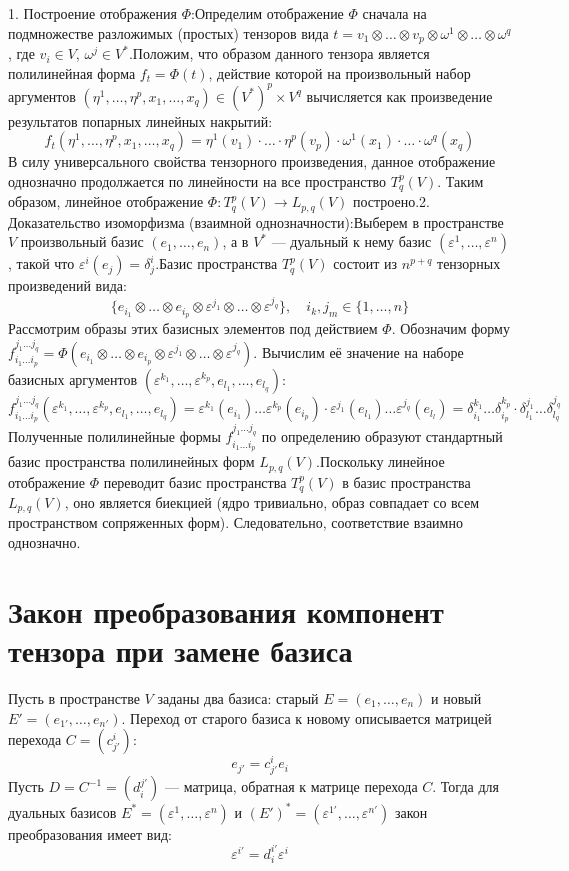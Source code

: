 \documentclass[14pt]{extreport}
\begin{document}
    \begin{prbox}
        1. Построение отображения $\Phi$:Определим отображение $\Phi$ сначала на подмножестве разложимых (простых) тензоров вида $t = v_1 \otimes \dots \otimes v_p \otimes \omega^1 \otimes \dots \otimes \omega^q$, где $v_i \in V$, $\omega^j \in V^*$.Положим, что образом данного тензора является полилинейная форма $f_t = \Phi(t)$, действие которой на произвольный набор аргументов $(\eta^1, \dots, \eta^p, x_1, \dots, x_q) \in (V^*)^p \times V^q$ вычисляется как произведение результатов попарных линейных накрытий:$$f_t(\eta^1, \dots, \eta^p, x_1, \dots, x_q) = \eta^1(v_1) \cdot \dots \cdot \eta^p(v_p) \cdot \omega^1(x_1) \cdot \dots \cdot \omega^q(x_q)$$В силу универсального свойства тензорного произведения, данное отображение однозначно продолжается по линейности на все пространство $T_q^p(V)$. Таким образом, линейное отображение $\Phi: T_q^p(V) \to L_{p,q}(V)$ построено.2. Доказательство изоморфизма (взаимной однозначности):Выберем в пространстве $V$ произвольный базис $(e_1, \dots, e_n)$, а в $V^*$ — дуальный к нему базис $(\varepsilon^1, \dots, \varepsilon^n)$, такой что $\varepsilon^i(e_j) = \delta_j^i$.Базис пространства $T_q^p(V)$ состоит из $n^{p+q}$ тензорных произведений вида:$$\{e_{i_1} \otimes \dots \otimes e_{i_p} \otimes \varepsilon^{j_1} \otimes \dots \otimes \varepsilon^{j_q}\}, \quad i_k, j_m \in \{1, \dots, n\}$$Рассмотрим образы этих базисных элементов под действием $\Phi$. Обозначим форму $f_{i_1 \dots i_p}^{j_1 \dots j_q} = \Phi(e_{i_1} \otimes \dots \otimes e_{i_p} \otimes \varepsilon^{j_1} \otimes \dots \otimes \varepsilon^{j_q})$. Вычислим её значение на наборе базисных аргументов $(\varepsilon^{k_1}, \dots, \varepsilon^{k_p}, e_{l_1}, \dots, e_{l_q})$:$$f_{i_1 \dots i_p}^{j_1 \dots j_q}(\varepsilon^{k_1}, \dots, \varepsilon^{k_p}, e_{l_1}, \dots, e_{l_q}) = \varepsilon^{k_1}(e_{i_1}) \dots \varepsilon^{k_p}(e_{i_p}) \cdot \varepsilon^{j_1}(e_{l_1}) \dots \varepsilon^{j_q}(e_{l_l}) = \delta_{i_1}^{k_1} \dots \delta_{i_p}^{k_p} \cdot \delta_{l_1}^{j_1} \dots \delta_{l_q}^{j_q}$$Полученные полилинейные формы $f_{i_1 \dots i_p}^{j_1 \dots j_q}$ по определению образуют стандартный базис пространства полилинейных форм $L_{p,q}(V)$.Поскольку линейное отображение $\Phi$ переводит базис пространства $T_q^p(V)$ в базис пространства $L_{p,q}(V)$, оно является биекцией (ядро тривиально, образ совпадает со всем пространством сопряженных форм). Следовательно, соответствие взаимно однозначно.
    \end{prbox}

    \section{Закон преобразования компонент тензора при замене базиса}
    Пусть в пространстве $V$ заданы два базиса: старый $E = (e_1, \dots, e_n)$ и новый $E' = (e_{1'}, \dots, e_{n'})$. Переход от старого базиса к новому описывается матрицей перехода $C = (c_{j'}^i)$:$$e_{j'} = c_{j'}^i e_i$$Пусть $D = C^{-1} = (d_i^{j'})$ — матрица, обратная к матрице перехода $C$. Тогда для дуальных базисов $E^* = (\varepsilon^1, \dots, \varepsilon^n)$ и $(E')^* = (\varepsilon^{1'}, \dots, \varepsilon^{n'})$ закон преобразования имеет вид:$$\varepsilon^{i'} = d_i^{i'} \varepsilon^i$$
\end{document}
